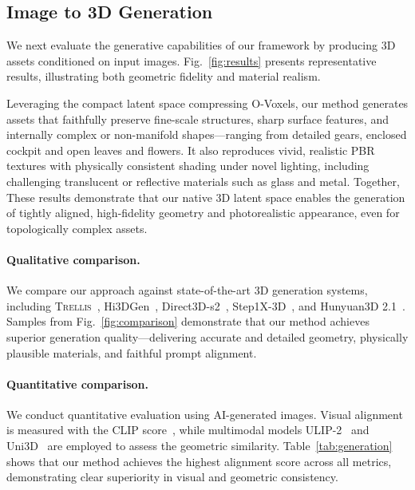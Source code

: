 \documentclass[10pt,twocolumn,letterpaper]{article}
\newcommand{\paravspace}{\vspace{-11pt}}
\begin{document}
\subsection{Image to 3D Generation}

We next evaluate the generative capabilities of our framework by producing 3D assets conditioned on input images. Fig.~\ref{fig:results} presents representative results, illustrating both geometric fidelity and material realism.

Leveraging the compact latent space compressing O-Voxels, our method generates assets that faithfully preserve fine-scale structures, sharp surface features, and internally complex or non-manifold shapes—ranging from detailed gears, enclosed cockpit and open leaves and flowers.
It also reproduces vivid, realistic PBR textures with physically consistent shading under novel lighting, including challenging translucent or reflective materials such as glass and metal.
Together, These results demonstrate that our native 3D latent space enables the generation of tightly aligned, high-fidelity geometry and photorealistic appearance, even for topologically complex assets.

\paravspace
\paragraph{Qualitative comparison.}
We compare our approach against state-of-the-art 3D generation systems, including \textsc{Trellis}~\cite{xiang2025structured}, Hi3DGen~\cite{ye2025hi3dgen}, Direct3D-s2~\cite{wu2025direct3d}, Step1X-3D~\cite{li2025step1x}, and Hunyuan3D 2.1~\cite{hunyuan3d2025hunyuan3d}. Samples from Fig.~\ref{fig:comparison} demonstrate that our method achieves superior generation quality—delivering accurate and detailed geometry, physically plausible materials, and faithful prompt alignment.

\paravspace
\paragraph{Quantitative comparison.}
We conduct quantitative evaluation using AI-generated images. Visual alignment is measured with the CLIP score~\cite{radford2021learning}, while multimodal models ULIP-2~\cite{xue2024ulip} and Uni3D~\cite{zhou2023uni3d} are employed to assess the geometric similarity. Table~\ref{tab:generation} shows that our method achieves the highest alignment score across all metrics, demonstrating clear superiority in visual and geometric consistency.
\end{document}

